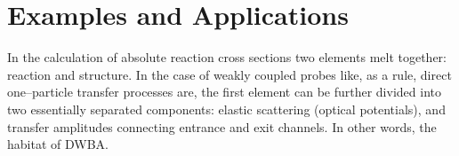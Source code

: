 \section{Examples and Applications}
  In the calculation of absolute reaction cross sections two elements melt together: reaction and structure.
  In the case of weakly coupled probes like, as a rule, direct one--particle transfer processes are, the first element can be further divided into two essentially separated components: elastic scattering (optical potentials), and transfer amplitudes connecting entrance and exit channels. In other words, the habitat of DWBA.
